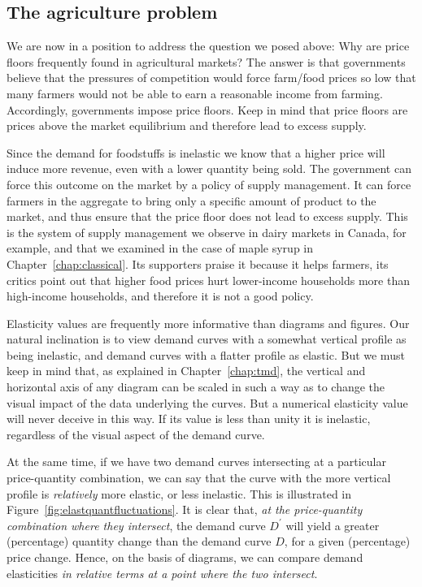 \newhtmlpage

\subsection*{The agriculture problem}

We are now in a position to address the question we posed above: Why are
price floors frequently found in agricultural markets? The answer is that
governments believe that the pressures of competition would force farm/food
prices so low that many farmers would not be able to earn a reasonable
income from farming. Accordingly, governments impose price floors.
Keep in mind that price floors are prices above the market equilibrium and
therefore lead to excess supply.

Since the demand for foodstuffs is inelastic we know that a higher
price will induce more revenue, even with a lower quantity being sold. The
government can force this outcome on the market by a policy of supply
management. It can force farmers in the aggregate to bring only a specific
amount of product to the market, and thus ensure that the price floor does
not lead to excess supply. This is the system of supply management we
observe in dairy markets in Canada, for example, and that we examined in
the case of maple syrup in Chapter~\ref{chap:classical}. Its supporters praise it
because it helps farmers, its critics point out that higher food prices hurt
lower-income households more than high-income households, and therefore it
is not a good policy.

Elasticity values are frequently more informative than diagrams and figures.
Our natural inclination is to view demand curves with a somewhat vertical
profile as being inelastic, and demand curves with a flatter profile as
elastic. But we must keep in mind that, as explained in Chapter~\ref{chap:tmd}, the
vertical and horizontal axis of any diagram can be scaled in such a way as
to change the visual impact of the data underlying the curves. But a
numerical elasticity value will never deceive in this way. If its value is
less than unity it is inelastic, regardless of the visual aspect of the
demand curve.

\newhtmlpage

At the same time, if we have two demand curves intersecting at a particular
price-quantity combination, we can say that the curve with the more vertical
profile is \textit{relatively} more elastic, or less inelastic. This is
illustrated in Figure~\ref{fig:elastquantfluctuations}. It is clear that, 
\textit{at the price-quantity combination where they intersect}, the demand
curve $D^{\prime}$ will yield a greater (percentage) quantity change than
the demand curve $D$, for a given (percentage) price change. Hence, on the
basis of diagrams, we can compare demand elasticities \textit{in relative
terms at a point where the two intersect}. 


